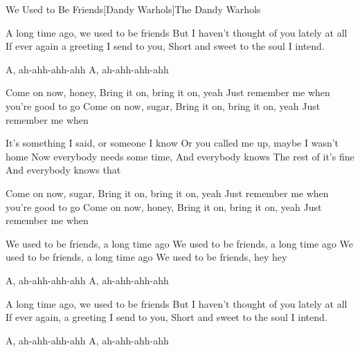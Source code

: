 \begin{Song}{We Used to Be Friends}[Dandy Warhols]{The Dandy Warhols}
\begin{multicols}{2}

\begin{Verse}
A long time ago, we used to be friends
But I haven't thought of you lately at all
If ever again a greeting I send to you,
Short and sweet to the soul I intend.
\espaceInterStrophe

A, ah-ahh-ahh-ahh
A, ah-ahh-ahh-ahh
\bis
\end{Verse}
\espaceInterStrophe

\begin{PreChorus}
Come on now, honey,
Bring it on, bring it on, yeah
Just remember me when you're good to go
Come on now, sugar,
Bring it on, bring it on, yeah
Just remember me when
\end{PreChorus}
\espaceInterStrophe

\begin{Verse}
It's something I said, or someone I know
Or you called me up, maybe I wasn't home
Now everybody needs some time,
And everybody knows
The rest of it's fine
And everybody knows that
\end{Verse}
\vfill
\columnbreak

\begin{PreChorus}
Come on now, sugar,
Bring it on, bring it on, yeah
Just remember me when you're good to go
Come on now, honey,
Bring it on, bring it on, yeah
Just remember me when
\end{PreChorus}
\espaceInterStrophe

\begin{Chorus}
We used to be friends, a long time ago
We used to be friends, a long time ago
We used to be friends, a long time ago
We used to be friends, hey hey
\end{Chorus}
\espaceInterStrophe

\begin{Verse}
A, ah-ahh-ahh-ahh
A, ah-ahh-ahh-ahh
\bis
\end{Verse}
\espaceInterStrophe

\begin{Verse}
A long time ago, we used to be friends
But I haven't thought of you lately at all
If ever again, a greeting I send to you,
Short and sweet to the soul I intend.
\end{Verse}
\espaceInterStrophe

\tochorus
\espaceInterStrophe

\begin{Verse}
A, ah-ahh-ahh-ahh
A, ah-ahh-ahh-ahh
\bis
\end{Verse}


\end{multicols}
\end{Song}
